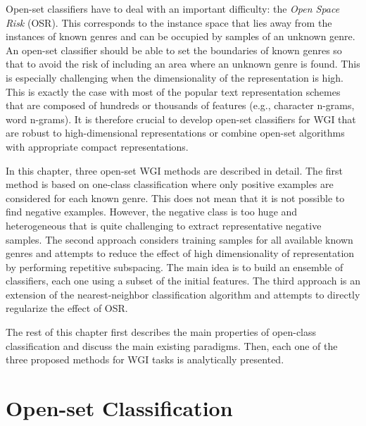 Open-set classifiers have to deal with an important difficulty: the \textit{Open Space Risk} (OSR). This corresponds to the instance space that lies away from the instances of known genres and can be occupied by samples of an unknown genre. An open-set classifier should be able to set the boundaries of known genres so that to avoid the risk of including an area where an unknown genre is found. This is especially challenging when the dimensionality of the representation is high. This is exactly the case with most of the popular text representation schemes that are composed of hundreds or thousands of features (e.g., character n-grams, word n-grams). It is therefore crucial to develop open-set classifiers for WGI that are robust to high-dimensional representations or combine open-set algorithms with appropriate compact representations. 

In this chapter, three open-set WGI methods are described in detail. The first method is based on one-class classification where only positive examples are considered for each known genre. This does not mean that it is not possible to find negative examples. However, the negative class is too huge and heterogeneous that is quite challenging to extract representative negative samples. The second approach considers training samples for all available known genres and attempts to reduce the effect of high dimensionality of representation by performing repetitive subspacing. The main idea is to build an ensemble of classifiers, each one using a subset of the initial features. The third approach is an extension of the nearest-neighbor classification algorithm and attempts to directly regularize the effect of OSR.


The rest of this chapter first describes the main properties of open-class classification and discuss the main existing paradigms. Then, each one of the three proposed methods for WGI tasks is analytically presented. 

\section{Open-set Classification}

